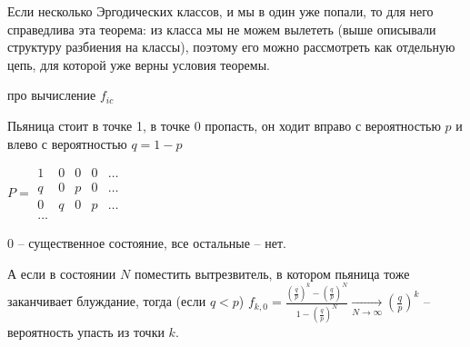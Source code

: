 Если несколько Эргодических классов, и мы в один уже попали, то для него справедлива эта теорема: 
из класса мы не можем вылететь (выше описывали структуру разбиения на классы), поэтому его можно рассмотреть как отдельную цепь, для которой уже верны условия теоремы.


\TODO про вычисление $f_{ic}$ \TODO

\begin{exmp}

Пьяница стоит в точке 1, в точке 0 пропасть, он ходит вправо с вероятностью $p$ и влево с вероятностью $q = 1 - p$

$P = \begin{matrix} 
1 & 0 & 0 & 0 & \dots \\
q & 0 & p & 0 & \dots \\
0 & q & 0 & p & \dots \\
\dots
\end{matrix}
$

0 -- существенное состояние, все остальные -- нет.

А если в состоянии $N$ поместить вытрезвитель, в котором пьяница тоже заканчивает блуждание, тогда (если $q < p$)
$f_{k,0} = \frac{(\frac{q}{p})^k - (\frac{q}{p})^N}{1 - (\frac{q}{p})^N} \xrightarrow[N \to \infty]{} (\frac{q}{p})^k$ -- вероятность упасть из точки $k$.
\end{exmp}
